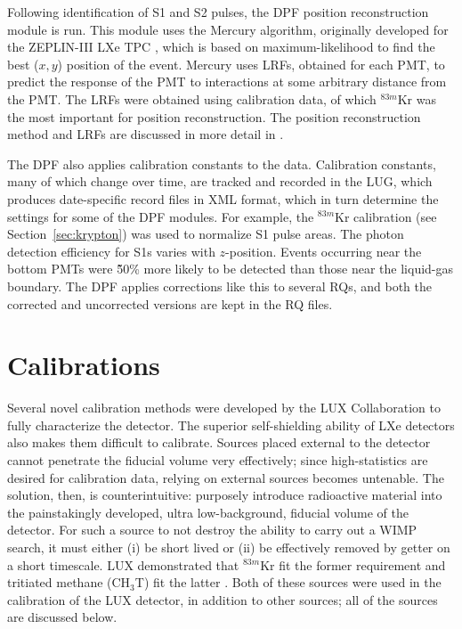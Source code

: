 Following identification of S1 and S2 pulses, the \ac{DPF} position reconstruction module is run. This module uses the Mercury algorithm, originally developed for the ZEPLIN-III \ac{LXe} \ac{TPC} \cite{Currie2012}, which is based on maximum-likelihood to find the best ($x,y$) position of the event. Mercury uses \ac{LRF}s, obtained for each \ac{PMT}, to predict the response of the \ac{PMT} to interactions at some arbitrary distance from the \ac{PMT}. The \ac{LRF}s were obtained using calibration data, of which $^{83m}$Kr was the most important for position reconstruction. The position reconstruction method and \ac{LRF}s are discussed in more detail in \cite{LUXPositionReconstruction}.


The \ac{DPF} also applies calibration constants to the data. Calibration constants, many of which change over time, are tracked and recorded in the \ac{LUG}, which produces date-specific record files in XML format, which in turn determine the settings for some of the \ac{DPF} modules. For example, the $^{83m}$Kr calibration (see Section~\ref{sec:krypton}) was used to normalize S1 pulse areas. The photon detection efficiency for S1s varies with $z$-position. Events occurring near the bottom \ac{PMT}s were \~50\% more likely to be detected than those near the liquid-gas boundary. The \ac{DPF} applies corrections like this to several \ac{RQ}s, and both the corrected and uncorrected versions are kept in the \ac{RQ} files. 


\section{Calibrations}
Several novel calibration methods were developed by the \ac{LUX} Collaboration to fully characterize the detector. The superior self-shielding ability of \ac{LXe} detectors also makes them difficult to calibrate. Sources placed external to the detector cannot penetrate the fiducial volume very effectively; since high-statistics are desired for calibration data, relying on external sources becomes untenable. The solution, then, is counterintuitive: purposely introduce radioactive material into the painstakingly developed, ultra low-background, fiducial volume of the detector. For such a source to not destroy the ability to carry out a \ac{WIMP} search, it must either (i) be short lived or (ii) be effectively removed by getter on a short timescale. \ac{LUX} demonstrated that $^{83m}$Kr fit the former \cite{LUXKr} requirement and tritiated methane (CH$_{3}$T) fit the latter \cite{LUXTritium}. Both of these sources were used in the calibration of the \ac{LUX} detector, in addition to other sources; all of the sources are discussed below. 

